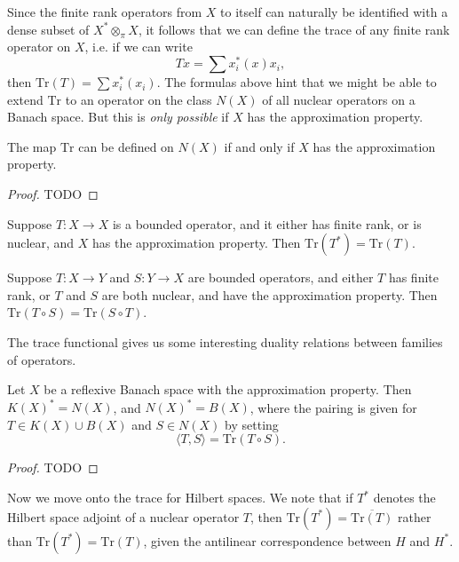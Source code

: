 Since the finite rank operators from $X$ to itself can naturally be identified with a dense subset of $X^* \otimes_\pi X$, it follows that we can define the trace of any finite rank operator on $X$, i.e. if we can write
%
\[ Tx = \sum x_i^*(x) x_i, \]
%
then $\text{Tr}(T) = \sum x_i^*(x_i)$. The formulas above hint that we might be able to extend $\text{Tr}$ to an operator on the class $N(X)$ of all nuclear operators on a Banach space. But this is \emph{only possible} if $X$ has the approximation property.

\begin{theorem}
    The map $\text{Tr}$ can be defined on $N(X)$ if and only if $X$ has the approximation property.
\end{theorem}
\begin{proof}
    TODO
\end{proof}

\begin{theorem}
    Suppose $T: X \to X$ is a bounded operator, and it either has finite rank, or is nuclear, and $X$ has the approximation property. Then $\text{Tr}(T^*) = \text{Tr}(T)$.
\end{theorem}

\begin{theorem}
    Suppose $T: X \to Y$ and $S: Y \to X$ are bounded operators, and either $T$ has finite rank, or $T$ and $S$ are both nuclear, and have the approximation property. Then $\text{Tr}(T \circ S) = \text{Tr}(S \circ T)$.
\end{theorem}

The trace functional gives us some interesting duality relations between families of operators.

\begin{theorem}
    Let $X$ be a reflexive Banach space with the approximation property. Then $K(X)^* = N(X)$, and $N(X)^* = B(X)$, where the pairing is given for $T \in K(X) \cup B(X)$ and $S \in N(X)$ by setting
    \[ \langle T, S \rangle = \text{Tr}(T \circ S). \]
\end{theorem}
\begin{proof}
    TODO
\end{proof}

Now we move onto the trace for Hilbert spaces. We note that if $T^*$ denotes the Hilbert space adjoint of a nuclear operator $T$, then $\text{Tr}(T^*) = \overline{\text{Tr}(T)}$ rather than $\text{Tr}(T^*) = \text{Tr}(T)$, given the antilinear correspondence between $H$ and $H^*$.

